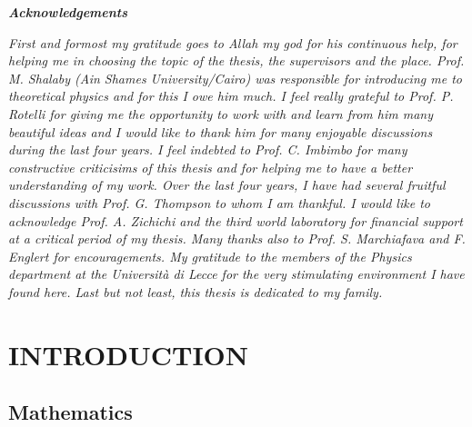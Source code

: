 \documentclass[a4paper,12pt]{book}
\begin{document}
\newpage
\thispagestyle{empty}
\vspace*{2cm}

\begin{center}
{\LARGE \textbf{\emph{Acknowledgements}}}
\end{center}

\vspace{1cm}

{\em
First and formost my gratitude goes to Allah my god for his continuous help, for 
helping me in 
choosing the topic of the thesis,
the supervisors and the place. Prof. M. Shalaby (Ain Shames University/Cairo) was responsible for 
introducing me to theoretical physics and for this I owe him much. I feel really grateful 
to Prof. P. Rotelli for
giving me the opportunity to work with and learn from him many beautiful ideas and I 
would like to thank him for many enjoyable discussions during the last four 
years. I feel indebted to Prof. C. Imbimbo for many constructive criticisims of this thesis
 and 
for helping me to have a better understanding of my work.
Over the last four years, I have had several fruitful discussions with Prof. G. 
Thompson  to whom I am thankful.
I would like to acknowledge Prof. A. Zichichi and the third world laboratory
for financial support at a critical period of my thesis.
Many thanks also to Prof. S. Marchiafava and F. Englert for encouragements.
My gratitude  to the members of  the Physics department at 
the
{\rm Universit\`a di Lecce} for the very stimulating
environment I have found here. Last but not least, this thesis is dedicated to my family.
}


\tableofcontents


  


\chapter{INTRODUCTION}

 \setcounter{page}{1}

\section{Mathematics}
\end{document}
